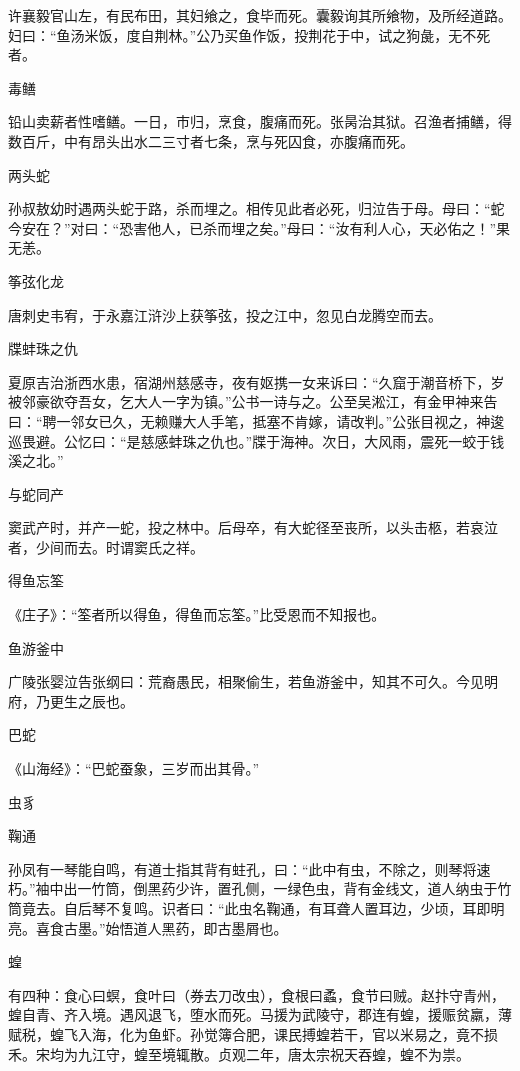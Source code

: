 \documentclass[a4paper,12pt,UTF8,twoside]{ctexbook}
\begin{document}
    许襄毅官山左，有民布田，其妇飨之，食毕而死。囊毅询其所飨物，及所经道路。妇曰：“鱼汤米饭，度自荆林。”公乃买鱼作饭，投荆花于中，试之狗彘，无不死者。
    
    毒鳝
    
    铅山卖薪者性嗜鳝。一日，市归，烹食，腹痛而死。张昺治其狱。召渔者捕鳝，得数百斤，中有昂头出水二三寸者七条，烹与死囚食，亦腹痛而死。
    
    两头蛇
    
    孙叔敖幼时遇两头蛇于路，杀而埋之。相传见此者必死，归泣告于母。母曰：“蛇今安在？”对曰：“恐害他人，已杀而埋之矣。”母曰：“汝有利人心，天必佑之！”果无恙。
    
    筝弦化龙
    
    唐刺史韦宥，于永嘉江浒沙上获筝弦，投之江中，忽见白龙腾空而去。
    
    牒蚌珠之仇
    
    夏原吉治浙西水患，宿湖州慈感寺，夜有妪携一女来诉曰：“久窟于潮音桥下，岁被邻豪欲夺吾女，乞大人一字为镇。”公书一诗与之。公至吴淞江，有金甲神来告曰：“聘一邻女已久，无赖赚大人手笔，抵塞不肯嫁，请改判。”公张目视之，神逡巡畏避。公忆曰：“是慈感蚌珠之仇也。”牒于海神。次日，大风雨，震死一蛟于钱溪之北。”
    
    与蛇同产
    
    窦武产时，并产一蛇，投之林中。后母卒，有大蛇径至丧所，以头击柩，若哀泣者，少间而去。时谓窦氏之祥。
    
    得鱼忘筌
    
    《庄子》：“筌者所以得鱼，得鱼而忘筌。”比受恩而不知报也。
    
    鱼游釜中
    
    广陵张婴泣告张纲曰：荒裔愚民，相聚偷生，若鱼游釜中，知其不可久。今见明府，乃更生之辰也。
    
    巴蛇
    
    《山海经》：“巴蛇蚕象，三岁而出其骨。”
    
    虫豸
    
    鞠通
    
    孙凤有一琴能自鸣，有道士指其背有蛀孔，曰：“此中有虫，不除之，则琴将速朽。”袖中出一竹筒，倒黑药少许，置孔侧，一绿色虫，背有金线文，道人纳虫于竹筒竟去。自后琴不复鸣。识者曰：“此虫名鞠通，有耳聋人置耳边，少顷，耳即明亮。喜食古墨。”始悟道人黑药，即古墨屑也。
    
    蝗
    
    有四种：食心曰螟，食叶曰（券去刀改虫），食根曰蟊，食节曰贼。赵抃守青州，蝗自青、齐入境。遇风退飞，堕水而死。马援为武陵守，郡连有蝗，援赈贫羸，薄赋税，蝗飞入海，化为鱼虾。孙觉簿合肥，课民搏蝗若干，官以米易之，竟不损禾。宋均为九江守，蝗至境辄散。贞观二年，唐太宗祝天吞蝗，蝗不为祟。
    
\end{document}

